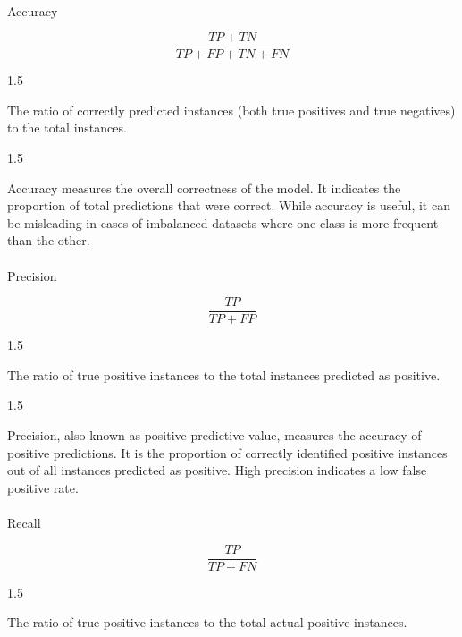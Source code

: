 \documentclass[
  a4paper,
]{scrbook}
\makeatletter
\let\oldparagraph\paragraph
\renewcommand{\paragraph}{
    \@ifstar
      \xxxParagraphStar
      \xxxParagraphNoStar
  }
\newcommand{\xxxParagraphStar}[1]{\oldparagraph*{#1}\mbox{}}
\newcommand{\xxxParagraphNoStar}[1]{\oldparagraph{#1}\mbox{}}
\providecommand{\tightlist}{%
  \setlength{\itemsep}{0pt}\setlength{\parskip}{0pt}}\usepackage{longtable,booktabs,array}
\let\olddescription\description
\let\endolddescription\enddescription
\renewenvironment{description}{
          \begin{spacing}{1.5}\olddescription
        }{
          \endolddescription\end{spacing}
        }
\makeatother
\begin{document}
\paragraph{Accuracy}\label{accuracy}

\[\frac{TP + TN}{TP+FP+TN+FN}\]

\begin{description}
\item[Definition]
The ratio of correctly predicted instances (both true positives and true
negatives) to the total instances.
\end{description}

\begin{description}
\item[Interpretation]
Accuracy measures the overall correctness of the model. It indicates the
proportion of total predictions that were correct. While accuracy is
useful, it can be misleading in cases of imbalanced datasets where one
class is more frequent than the other.
\end{description}

\paragraph{Precision}\label{precision}

\[\frac{TP}{TP+FP}\]

\begin{description}
\item[Definition]
The ratio of true positive instances to the total instances predicted as
positive.
\end{description}

\begin{description}
\item[Interpretation]
Precision, also known as positive predictive value, measures the
accuracy of positive predictions. It is the proportion of correctly
identified positive instances out of all instances predicted as
positive. High precision indicates a low false positive rate.
\end{description}

\paragraph{Recall}\label{recall}

\[\frac{TP}{TP+FN}\]

\begin{description}
\tightlist
\item[Definition]
The ratio of true positive instances to the total actual positive
instances.
\end{description}
\end{document}
